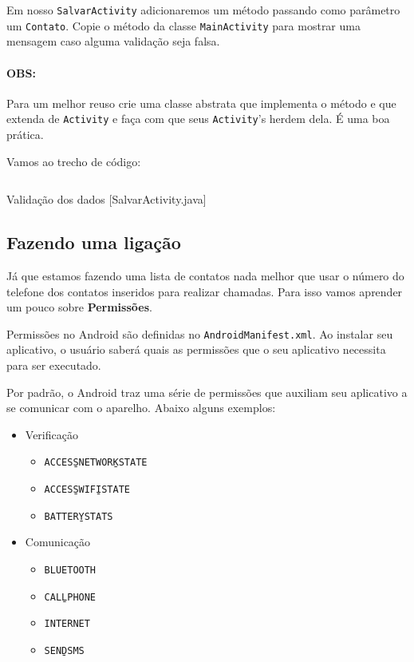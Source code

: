 Em nosso \texttt{SalvarActivity} adicionaremos um método  passando como parâmetro
um \texttt{Contato}. Copie o método  da classe \texttt{MainActivity} para
mostrar uma mensagem caso alguma validação seja falsa.

\paragraph{OBS:} Para um melhor reuso crie uma classe abstrata que implementa o método 
e que extenda de \texttt{Activity} e faça com que seus \texttt{Activity}'s herdem dela. É uma boa
prática.

Vamos ao trecho de código:

\begin{listing}[H]
  \inputminted[linenos=true,frame=bottomline,tabsize=3]{ java }{ source/SalvarActivity-4.java }
  \caption{Validação dos dados [SalvarActivity.java]}
\end{listing}

\subsection{Fazendo uma ligação}

Já que estamos fazendo uma lista de contatos nada melhor que usar o número do telefone dos
contatos inseridos para realizar chamadas. Para isso vamos aprender um pouco sobre \textbf{Permissões}.

Permissões no Android são definidas no \texttt{AndroidManifest.xml}. Ao instalar seu aplicativo,
o usuário saberá quais as permissões que o seu aplicativo necessita para ser executado.

Por padrão, o Android traz uma série de permissões que auxiliam seu aplicativo a se comunicar com
o aparelho. Abaixo alguns exemplos:

\begin{itemize}
\item Verificação
\begin{itemize}
  \item \texttt{ACCESS\b{ }NETWORK\b{ }STATE}
  \item \texttt{ACCESS\b{ }WIFI\b{ }STATE}
  \item \texttt{BATTERY\b{ }STATS}
\end{itemize}

\item Comunicação
\begin{itemize}
  \item \texttt{BLUETOOTH}
  \item \texttt{CALL\b{ }PHONE}
  \item \texttt{INTERNET}
  \item \texttt{SEND\b{ }SMS}
\end{itemize}

\end{itemize}

